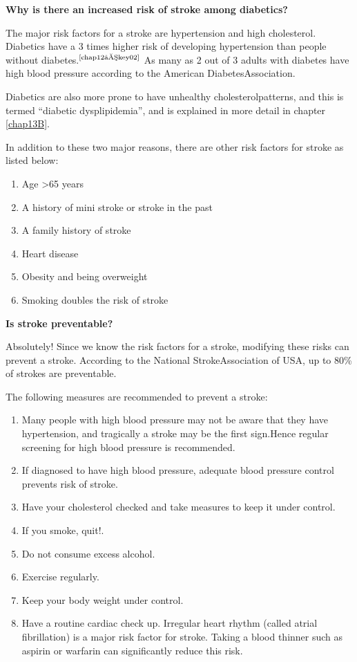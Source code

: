 \noindent\textbf{Why is there an increased risk of stroke among diabetics?}

The major risk factors for a stroke are hypertension and high chole\-sterol. Diabetics have a 3 times higher risk of developing hypertension than people without diabetes.$^{\text{\cite{chap12–key02}}}$ As many as 2 out of 3 adults with dia\-betes have high blood pressure according to the American Diabetes\break Association.

Diabetics are also more prone to have unhealthy cholesterol\break patterns, and this is termed “diabetic dysplipidemia”, and is explained in more detail in chapter \ref{chap13B}.

In addition to these two major reasons, there are other risk factors for stroke as listed below:

\vspace{-\topsep}
\begin{enumerate}[•]
\itemsep=0pt
\item Age \textgreater  65 years
\item A history of mini stroke or stroke in the past
\item A family history of stroke
\item Heart disease
\item Obesity and being overweight
\item Smoking doubles the risk of stroke
\end{enumerate}

\noindent\textbf{Is stroke preventable?}
\vskip 6pt

Absolutely! Since we know the risk factors for a stroke, modi\-fying these risks can prevent a stroke. According to the National Stroke\break Association of USA, up to 80\% of strokes are preventable.

\noindent The following measures are recommended to prevent a stroke:

\vspace{-\topsep}
\begin{enumerate}[•]
\itemsep=0pt
\item Many people with high blood pressure may not be aware that they have hypertension, and tragically a stroke may be the first sign.\break Hence regular screening for high blood pressure is recommended.
\item If diagnosed to have high blood pressure, adequate blood pressure control prevents risk of stroke.
\item Have your cholesterol checked and take measures to keep it under control.
\item If you smoke, quit!.
\item Do not consume excess alcohol.
\item Exercise regularly.
\item Keep your body weight under control.
\item Have a routine cardiac check up. Irregular heart rhythm (called atrial fibrillation) is a major risk factor for stroke. Taking a blood thinner such as aspirin or warfarin can significantly reduce this risk.
\end{enumerate}
\vspace{-\topsep}

